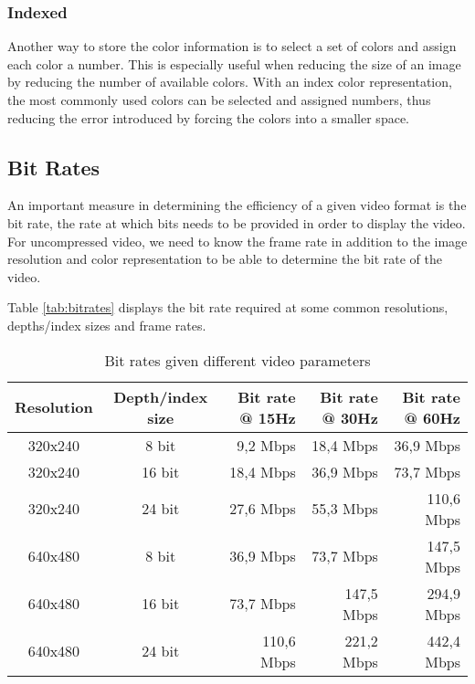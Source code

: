\subsubsection{Indexed}
Another way to store the color information is to select a set of colors and assign each color a number.
This is especially useful when reducing the size of an image by reducing the number of available colors.
With an index color representation, the most commonly used colors can be selected and assigned numbers, thus reducing the error introduced by forcing the colors into a smaller space.

\subsection{Bit Rates}
An important measure in determining the efficiency of a given video format is the bit rate, the rate at which bits needs to be provided in order to display the video.
For uncompressed video, we need to know the frame rate in addition to the image resolution and color representation to be able to determine the bit rate of the video.

Table \ref{tab:bitrates} displays the bit rate required at some common resolutions, depths/index sizes and frame rates.
\begin{table}[]
    \centering
    \begin{tabular}{ccrrr}
        Resolution & Depth/index size & Bit rate @ 15Hz & Bit rate @ 30Hz & Bit rate @ 60Hz \\
        \hline
        320x240 & 8 bit & 9,2 Mbps   & 18,4 Mbps  & 36,9 Mbps  \\
        320x240 & 16 bit & 18,4 Mbps  & 36,9 Mbps  & 73,7 Mbps  \\
        320x240 & 24 bit & 27,6 Mbps  & 55,3 Mbps  & 110,6 Mbps \\
        640x480 & 8 bit & 36,9 Mbps  & 73,7 Mbps  & 147,5 Mbps \\
        640x480 & 16 bit & 73,7 Mbps  & 147,5 Mbps & 294,9 Mbps \\
        640x480 & 24 bit & 110,6 Mbps & 221,2 Mbps & 442,4 Mbps
    \end{tabular}
    \label{fig:bitrates}
    \caption{Bit rates given different video parameters}
\end{table}
